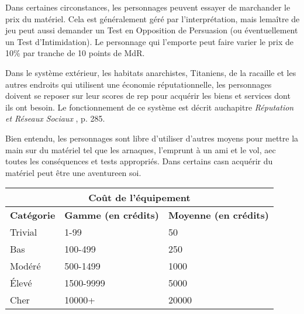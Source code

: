 Dans certaines circonstances, les personnages peuvent essayer de marchander le prix du matériel. Cela est généralement géré par l'interprétation, mais lemaître de jeu peut aussi demander un Test en Opposition de Persuasion (ou éventuellement un Test d'Intimidation). Le personnage qui l'emporte peut faire varier le prix de 10\% par tranche de 10 points de MdR. 

Dans le système extérieur, les habitats anarchistes, Titaniens, de la racaille et les autres endroits qui utilisent une économie réputationnelle, les personnages doivent se reposer sur leur scores de rep pour acquérir les biens et services dont ils ont besoin. Le fonctionnement de ce système est décrit auchapitre \emph{Réputation et Réseaux Sociaux }, p. 285. 

Bien entendu, les personnages sont libre d'utiliser d'autres moyens pour mettre la main sur du matériel tel que les arnaques, l'emprunt à un ami et le vol, aec toutes les conséquences et tests appropriés. Dans certains casn acquérir du matériel peut être une aventureen soi. 

\begin{table} \begin{tabular}{|l|l|l|} \hline

\multicolumn{3}{|c|}{\textbf{Coût de l'équipement}}	\\ \hline

\textbf{Catégorie}	&\textbf{Gamme (en crédits)}	&\textbf{Moyenne (en crédits)} \\ \hline

Trivial	&1-99	&50 \\ \hline

Bas	&100-499	&250 \\ \hline

Modéré	&500-1499	&1000 \\ \hline

Élevé	&1500-9999	&5000 \\ \hline

Cher	&10000+	&20000 \\ \hline

\end{tabular} \label{tab:gear-costs} \end{table} 

